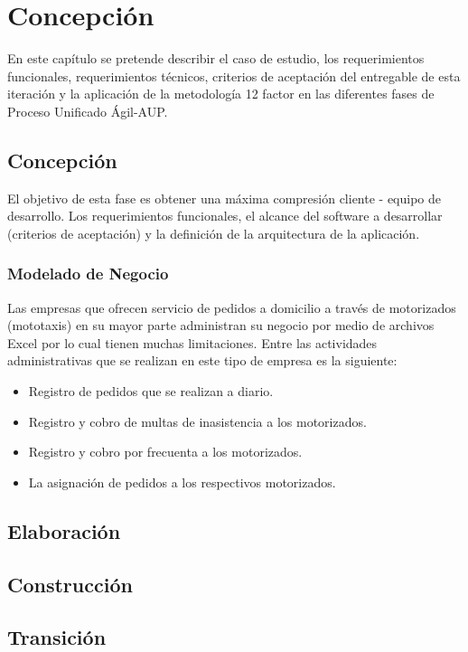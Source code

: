 \chapter{Concepción}
\noindent En este capítulo se pretende describir el caso de estudio, los requerimientos funcionales, requerimientos técnicos, criterios de aceptación del entregable de esta iteración y la aplicación de la metodología 12 factor en las diferentes fases de Proceso Unificado Ágil-AUP.

\section{Concepción}
\noindent El objetivo de esta fase es obtener una máxima compresión cliente - equipo de desarrollo. Los requerimientos funcionales, el alcance del software a desarrollar (criterios de aceptación) y la definición de la arquitectura de la aplicación.

\subsection {Modelado de Negocio}
\noindent Las empresas que ofrecen servicio de pedidos a domicilio a través de motorizados (mototaxis) en su mayor parte administran su negocio por medio de archivos Excel por lo cual tienen muchas limitaciones.
Entre las actividades administrativas que se realizan en este tipo de empresa es la siguiente:
\begin {itemize}
\item Registro de pedidos que se realizan a diario.
\item Registro y cobro de multas de inasistencia a los 	motorizados.
\item Registro y cobro por frecuenta a los motorizados.
\item La asignación de pedidos a los respectivos 	motorizados.
\end{itemize}
\section{Elaboración}
\section{Construcción}
\section{Transición}